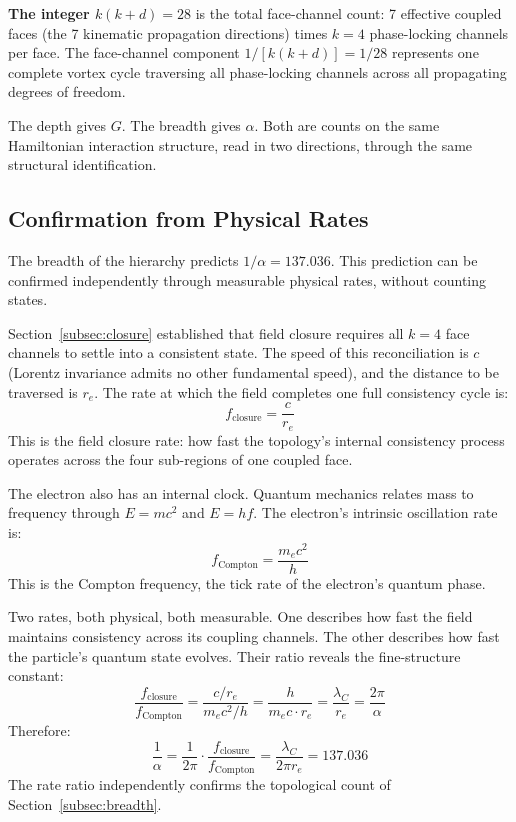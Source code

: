\documentclass[aps,prd,preprint,superscriptaddress,showpacs,preprintnumbers,amsmath,amssymb,nofootinbib]{revtex4-2}
\begin{document}
\textbf{The integer $k(k{+}d) = 28$} is the total face-channel count: 7 effective coupled faces (the 7 kinematic propagation directions) times $k = 4$ phase-locking channels per face. The face-channel component $1/[k(k{+}d)] = 1/28$ represents one complete vortex cycle traversing all phase-locking channels across all propagating degrees of freedom.

The depth gives $G$. The breadth gives $\alpha$. Both are counts on the same Hamiltonian interaction structure, read in two directions, through the same structural identification.

\subsection{Confirmation from Physical Rates}
\label{subsec:rates}

The breadth of the hierarchy predicts $1/\alpha = 137.036$. This prediction can be confirmed independently through measurable physical rates, without counting states.

Section~\ref{subsec:closure} established that field closure requires all $k = 4$ face channels to settle into a consistent state. The speed of this reconciliation is $c$ (Lorentz invariance admits no other fundamental speed), and the distance to be traversed is $r_e$. The rate at which the field completes one full consistency cycle is:
\begin{equation}
f_{\text{closure}} = \frac{c}{r_e}
\end{equation}
This is the field closure rate: how fast the topology's internal consistency process operates across the four sub-regions of one coupled face.

The electron also has an internal clock. Quantum mechanics relates mass to frequency through $E = mc^2$ and $E = hf$. The electron's intrinsic oscillation rate is:
\begin{equation}
f_{\text{Compton}} = \frac{m_e c^2}{h}
\end{equation}
This is the Compton frequency, the tick rate of the electron's quantum phase.

Two rates, both physical, both measurable. One describes how fast the field maintains consistency across its coupling channels. The other describes how fast the particle's quantum state evolves. Their ratio reveals the fine-structure constant:
\begin{equation}
\frac{f_{\text{closure}}}{f_{\text{Compton}}} = \frac{c/r_e}{m_e c^2/h} = \frac{h}{m_e c \cdot r_e} = \frac{\lambda_C}{r_e} = \frac{2\pi}{\alpha}
\end{equation}
Therefore:
\begin{equation}
\frac{1}{\alpha} = \frac{1}{2\pi} \cdot \frac{f_{\text{closure}}}{f_{\text{Compton}}} = \frac{\lambda_C}{2\pi r_e} = 137.036
\label{eq:alpha-rates}
\end{equation}
The rate ratio independently confirms the topological count of Section~\ref{subsec:breadth}.
\end{document}
